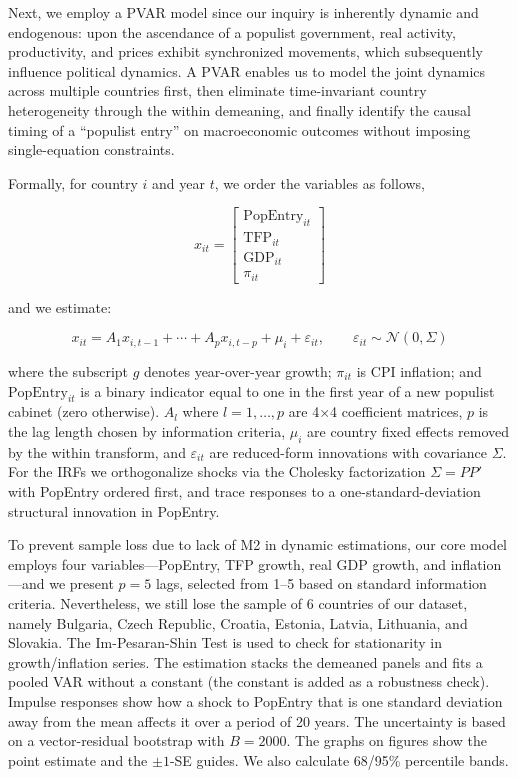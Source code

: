 \documentclass{OUP-EJ}
\begin{document}
Next, we employ a PVAR model since our inquiry is inherently dynamic and endogenous: upon the ascendance of a populist government, real activity, productivity, and prices exhibit synchronized movements, which subsequently influence political dynamics. A PVAR enables us to model the joint dynamics across multiple countries first, then eliminate time-invariant country heterogeneity through the within demeaning, and finally identify the causal timing of a ``populist entry” on macroeconomic outcomes without imposing single-equation constraints.

Formally, for country $i$ and year $t$, we order the variables as follows,

\begin{equation}
x_{it} = 
\begin{bmatrix}
\text{PopEntry}_{it} \\
\text{TFP}_{it} \\
\text{GDP}_{it} \\
\pi_{it}
\end{bmatrix}
\end{equation}

and we estimate:

\begin{equation}
x_{it} = A_{1} x_{i,t-1} + \cdots + A_{p} x_{i,t-p} + \mu_{i} + \varepsilon_{it}, 
\qquad \varepsilon_{it} \sim \mathcal{N}(0, \Sigma)
\end{equation}

where the subscript $g$ denotes year-over-year growth; $\pi_{it}$ is CPI inflation; and  $\text{PopEntry}_{it}$ is a binary indicator equal to one in the first year of a new populist cabinet (zero otherwise). $A_l$ where $l=1,…,p$ are 4×4 coefficient matrices, $p$ is the lag length chosen by information criteria, $\mu_i$ are country fixed effects removed by the within transform, and $\varepsilon_{it} $ are reduced-form innovations with covariance $\Sigma $. For the IRFs we orthogonalize shocks via the Cholesky factorization $\Sigma =PP′$ with PopEntry ordered first, and trace responses to a one-standard-deviation structural innovation in PopEntry.

To prevent sample loss due to lack of M2 in dynamic estimations, our core model employs four variables—PopEntry, TFP growth, real GDP growth, and inflation—and we present $p=5$ lags, selected from 1–5 based on standard information criteria. Nevertheless, we still lose the sample of 6 countries of our dataset, namely Bulgaria, Czech Republic, Croatia, Estonia, Latvia, Lithuania, and Slovakia. The Im-Pesaran-Shin Test \cite{ImEtAl2003} is used to check for stationarity in growth/inflation series. The estimation stacks the demeaned panels and fits a pooled VAR without a constant (the constant is added as a robustness check). Impulse responses show how a shock to PopEntry that is one standard deviation away from the mean affects it over a period of 20 years. The uncertainty is based on a vector-residual bootstrap with $B=2000$. The graphs on figures show the point estimate and the $\pm1$-SE guides. We also calculate 68/95\% percentile bands.
\end{document}
